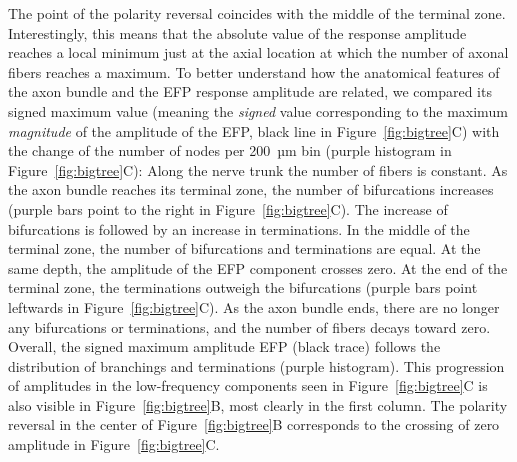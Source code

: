 \documentclass[]{elife}
\begin{document}
The point of the polarity reversal coincides with the middle of the
terminal zone. Interestingly, this means that the absolute value of the
response amplitude reaches a local minimum just at the axial location at
which the number of axonal fibers reaches a maximum. To better
understand how the anatomical features of the axon bundle and the EFP
response amplitude are related, we compared its signed maximum value
(meaning the \emph{signed} value corresponding to the maximum
\emph{magnitude} of the amplitude of the EFP, black line in
Figure~\ref{fig:bigtree}C) with the change of the number of nodes per
200~µm bin (purple histogram in Figure~\ref{fig:bigtree}C): Along the
nerve trunk the number of fibers is constant. As the axon bundle reaches
its terminal zone, the number of bifurcations increases (purple bars
point to the right in Figure~\ref{fig:bigtree}C). The increase of
bifurcations is followed by an increase in terminations. In the middle
of the terminal zone, the number of bifurcations and terminations are
equal. At the same depth, the amplitude of the EFP component crosses
zero. At the end of the terminal zone, the terminations outweigh the
bifurcations (purple bars point leftwards in Figure~\ref{fig:bigtree}C).
As the axon bundle ends, there are no longer any bifurcations or
terminations, and the number of fibers decays toward zero. Overall, the
signed maximum amplitude EFP (black trace) follows the distribution of
branchings and terminations (purple histogram). This progression of
amplitudes in the low-frequency components seen in
Figure~\ref{fig:bigtree}C is also visible in Figure~\ref{fig:bigtree}B,
most clearly in the first column. The polarity reversal in the center of
Figure~\ref{fig:bigtree}B corresponds to the crossing of zero amplitude
in Figure~\ref{fig:bigtree}C.
\end{document}
